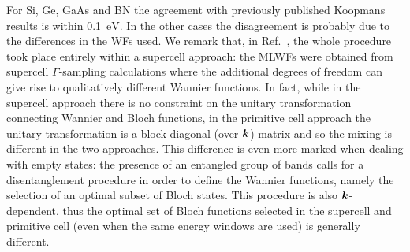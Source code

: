 For Si, Ge, GaAs and BN the agreement with previously published Koopmans results \cite{nguyen_koopmans-compliant_2018} is within 0.1~$\si{\electronvolt}$. In the other cases the disagreement is probably due to the differences in the WFs used. We remark that, in Ref.~\cite{nguyen_koopmans-compliant_2018}, the whole procedure took place entirely within a supercell approach: the MLWFs were obtained from supercell $\Gamma$-sampling calculations where the additional degrees of freedom can give rise to qualitatively different Wannier functions. In fact, while in the supercell approach there is no constraint on the unitary transformation connecting Wannier and Bloch functions, in the primitive cell approach the unitary transformation is a block-diagonal (over ${\bm k}$) matrix and so the mixing is different in the two approaches. This difference is even more marked when dealing with empty states: the presence of an entangled group of bands calls for a disentanglement procedure in order to define the Wannier functions, namely the selection of an optimal subset of Bloch states. This procedure is also ${\bm k}$-dependent, thus the optimal set of Bloch functions selected in the supercell and primitive cell (even when the same energy windows are used) is generally different.

